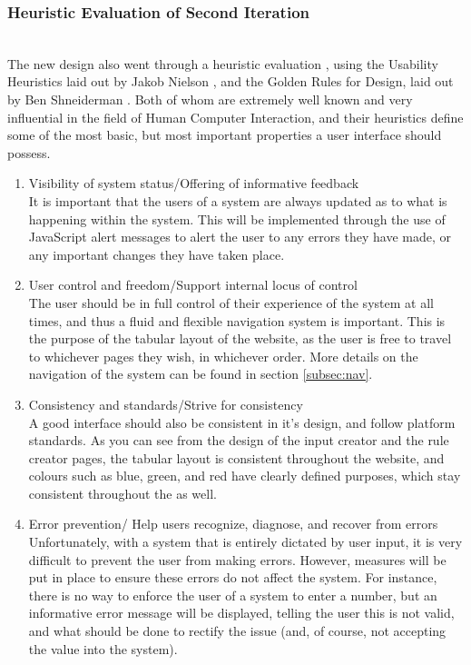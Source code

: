 \subsubsection{Heuristic Evaluation of Second Iteration}\ \\
The new design also went through a heuristic evaluation \cite{nielsen1990heuristic}, using the Usability Heuristics laid out by Jakob Nielson \cite{nielsen2005ten}, and the Golden Rules for Design, laid out by Ben Shneiderman \cite{shneiderman2005designing}. Both of whom are extremely well known and very influential in the field of Human Computer Interaction, and their heuristics define some of the most basic, but most important properties a user interface should possess. 

\begin{enumerate}
\item Visibility of system status/Offering of informative feedback\\

It is important that the users of a system are always updated as to what is happening within the system. This will be implemented through the use of JavaScript alert messages to alert the user to any errors they have made, or any important changes they have taken place.

\item User control and freedom/Support internal locus of control\\
The user should be in full control of their experience of the system at all times, and thus a fluid and flexible navigation system is important. This is the purpose of the tabular layout of the website, as the user is free to travel to whichever pages they wish, in whichever order. More details on the navigation of the system can be found in section \ref{subsec:nav}.

\item Consistency and standards/Strive for consistency\\
A good interface should also be consistent in it's design, and follow platform standards. As you can see from the design of the input creator and the rule creator pages, the tabular layout is consistent throughout the website, and colours such as blue, green, and red have clearly defined purposes, which stay consistent throughout the as well.

\item Error prevention/ Help users recognize, diagnose, and recover from errors\\
Unfortunately, with a system that is entirely dictated by user input, it is very difficult to prevent the user from making errors. However, measures will be put in place to ensure these errors do not affect the system. For instance, there is no way to enforce the user of a system to enter a number, but an informative error message will be displayed, telling the user this is not valid, and what should be done to rectify the issue (and, of course, not accepting the value into the system).


\end{enumerate}
